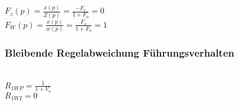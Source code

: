 \begin{minipage}{0.45\textwidth}
$F_z(p) = \frac{x(p)}{Z(p)} = \frac{-F_s}{1+F_o} = 0$ \\
 $F_W(p) = \frac{x(p)}{w(p)} = \frac{F_o}{1+F_o} = 1$ \\

\end{minipage}
\begin{minipage}{0.45\textwidth}

\end{minipage}

\subsubsection{Bleibende Regelabweichung Führungsverhalten}
\begin{minipage}{0.45\textwidth}
 \\
$R_{1WP} = \frac{1}{1+V_o}$ \\
 $R_{1WI} = 0$ \\

\end{minipage}
\begin{minipage}{0.45\textwidth}

\end{minipage}

